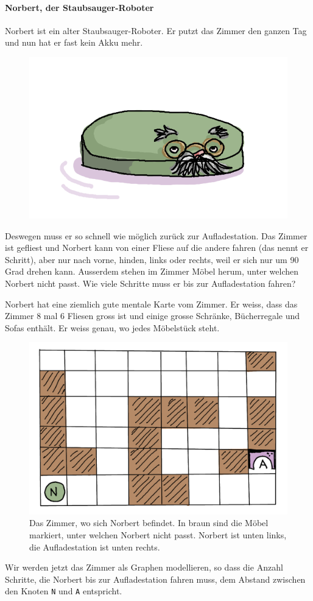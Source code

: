 \paragraph{Norbert, der Staubsauger-Roboter}
Norbert ist ein alter Staubsauger-Roboter. Er putzt das Zimmer den ganzen Tag und nun hat er fast kein Akku mehr.
\begin{figure}
\includegraphics[width=0.9\linewidth]{Pictures/SP/norbert.png} 
\label{fig:norbert}
\end{figure}
Deswegen muss er so schnell wie möglich zurück zur Aufladestation.
Das Zimmer ist gefliest und Norbert kann von einer Fliese auf die andere fahren (das nennt er Schritt), aber nur nach vorne, hinden, links oder rechts, weil er sich nur um 90 Grad drehen kann. Ausserdem stehen im Zimmer Möbel herum, unter welchen Norbert nicht passt. Wie viele Schritte muss er bis zur Aufladestation fahren?

Norbert hat eine ziemlich gute mentale Karte vom Zimmer. Er weiss, dass das Zimmer 8 mal 6 Fliesen gross ist und einige grosse Schränke, Bücherregale und Sofas enthält. Er weiss genau, wo jedes Möbelstück steht.
\begin{figure}[H]
    \centering
    \includegraphics[width=\textwidth]{Pictures/SP/norbert_zimmer.png}
    \caption{Das Zimmer, wo sich Norbert befindet. In braun sind die Möbel markiert, unter welchen Norbert nicht passt. Norbert ist unten links, die Aufladestation ist unten rechts.}
    \label{fig:norbert_zimmer}
\end{figure}
Wir werden jetzt das Zimmer als Graphen modellieren, so dass die Anzahl Schritte, die Norbert bis zur Aufladestation fahren muss, dem Abstand zwischen den Knoten \texttt{N} und \texttt{A} entspricht.

